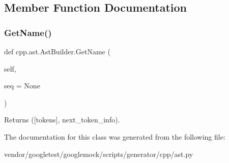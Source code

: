 \subsection{Member Function Documentation}
\mbox{\label{classcpp_1_1ast_1_1_ast_builder_a327957c4228325fc5f64821b047bdc6f}} 
\subsubsection{\texorpdfstring{Get\+Name()}{GetName()}}
{\footnotesize\ttfamily def cpp.\+ast.\+Ast\+Builder.\+Get\+Name (\begin{DoxyParamCaption}\item[{}]{self,  }\item[{}]{seq = {\ttfamily None} }\end{DoxyParamCaption})}

\begin{DoxyVerb}Returns ([tokens], next_token_info).\end{DoxyVerb}
 

The documentation for this class was generated from the following file\+:\begin{DoxyCompactItemize}
\item 
vendor/googletest/googlemock/scripts/generator/cpp/ast.\+py\end{DoxyCompactItemize}
